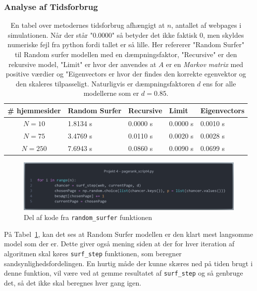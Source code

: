 \subsubsection*{Analyse af Tidsforbrug}
\begin{table}[!h]
    \centering
    \begin{tabular}{c|l|l|l|l}
        \# hjemmesider & Random Surfer & Recursive & Limit & Eigenvectors \\
        \hline
        $N = 10$       & 1.8134 s   & 0.0000 s   & 0.0000 s   & 0.0010 s   \\
        $N = 75$       & 3.4769 s   & 0.0110 s   & 0.0020 s   & 0.0028 s   \\
        $N = 250$      & 7.6943 s   & 0.0860 s   & 0.0090 s   & 0.0699 s
    \end{tabular}
    \caption{En tabel over metodernes tidsforbrug afhængigt at $n$, antallet af webpages i simulationen. Når der står "0.0000" så betyder det ikke faktisk 0, men skyldes numeriske fejl fra python fordi tallet er så lille. Her refererer "Random Surfer" til Random surfer modellen med en dæmpningsfaktor, "Recursive" er den rekursive model, "Limit" er hvor der anvendes at $A$ er en \textit{Markov matrix} med positive værdier og "Eigenvectors er hvor der findes den korrekte egenvektor og den skaleres tilpasseligt. Naturligvis er dæmpningsfaktoren $d$ ens for alle modellerne som er $d = 0.85$.}
    \label{tidsFigur}
\end{table}

\begin{figure}
    \centering
    \includegraphics[width = \linewidth]{Billeder/Kode1.png}
    \caption{Del af kode fra \texttt{random\_surfer} funktionen}
\end{figure}


På Tabel~\ref{tidsFigur}, kan det ses at Random Surfer modellen er den klart mest langsomme model som der er. Dette giver også mening siden at der for hver iteration af algoritmen skal køres \texttt{surf\_step} funktionen, som beregner sandsynlighedsfordelingen. En hurtig måde der kunne skæres ned på tiden brugt i denne funktion, vil være ved at gemme resultatet af \texttt{surf\_step} og så genbruge det, så det ikke skal beregnes hver gang igen.

